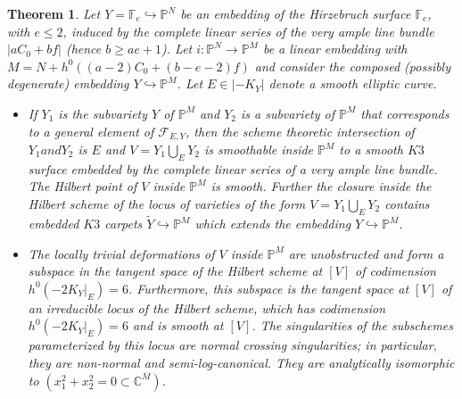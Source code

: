 \documentclass[11pt,twoside]{amsart}
\theoremstyle{plain}
\numberwithin{equation}{section}
\newtheorem{theorem}{Theorem}[section]
\theoremstyle{definition}
\begin{document}
\begin{theorem}\label{Hirzebruch main}
Let $Y = \mathbb{F}_e \hookrightarrow \mathbb{P}^N$ be an embedding of the Hirzebruch surface $\mathbb{F}_e$, with $e \leq 2$, induced by the complete linear series of the very ample line bundle $|aC_0+bf|$ (hence $b \geq ae+1$). Let $i: \mathbb{P}^N \to \mathbb{P}^M$ be a linear embedding with $M = N + h^0((a-2)C_0+(b-e-2)f)$ and consider the composed (possibly degenerate) embedding $Y \hookrightarrow \mathbb{P}^M$. Let $E \in |-K_Y|$ denote a smooth elliptic curve. 

\begin{itemize}
    \item[(1)] If $Y_1$ is the subvariety $Y$ of $\mathbb P^M$ and $Y_2$ is a subvariety of $\mathbb P^M$ that corresponds to a general element of $\mathcal{F}_{E,Y}$, then {the scheme theoretic intersection of $Y_1 and Y_2$ is $E$ and} {$V = Y_1 \bigcup_E Y_2$} is  smoothable inside $\mathbb{P}^M$ to a \textit{smooth $K3$ surface} embedded by the complete linear series of a very ample line bundle. The Hilbert point of $V$ inside $\mathbb{P}^M$ is smooth. 
     Further the closure inside the Hilbert scheme of the locus of varieties of the form $V = Y_1 \bigcup_E Y_2$ contains embedded $K3$ carpets $\widetilde{Y} \hookrightarrow \mathbb{P}^M$ which extends the embedding $Y \hookrightarrow \mathbb{P}^M$.  
    
    \smallskip
    
    \item[(2)] The locally trivial deformations of $V$ inside $\mathbb{P}^M$ are unobstructed and form a subspace in the tangent space of the Hilbert scheme at $[V]$ of codimension $h^0(-2K_Y|_E) = 6$. Furthermore, this subspace is the tangent space at $[V]$ of an irreducible locus of the Hilbert scheme, which has codimension $h^0(-2K_Y|_E) = 6$ and is smooth at $[V]$. The singularities of the subschemes parameterized by this locus are normal crossing singularities;  in particular, they are non-normal and semi-log-canonical. They are analytically isomorphic to $(x_1^2+x_2^2 = 0 \subset \mathbb{C}^M)$. 
    \smallskip
    

\end{itemize}
\end{theorem}
\end{document}
